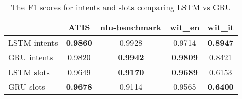 
\begin{table}
  \begin{tabularx}{\textwidth}{Lcccc}
    \toprule
    & \textbf{ATIS} & \textbf{nlu-benchmark} & \textbf{wit\_en} & \textbf{wit\_it} \\
    \midrule
    LSTM intents & \textbf{0.9860} & 0.9928 & 0.9714 & \textbf{0.8947} \\
    GRU intents & 0.9820 & \textbf{0.9942} & \textbf{0.9809} & 0.8421 \\
    \midrule
    LSTM slots & 0.9649 & \textbf{0.9170} & \textbf{0.9689} & 0.6153 \\
    GRU slots & \textbf{0.9678} & 0.9114 & 0.9565 & \textbf{0.6400} \\
    \bottomrule
  \end{tabularx}
  \caption{The F1 scores for intents and slots comparing LSTM vs GRU}\label{tab:LSTMvsGRU}
\end{table}